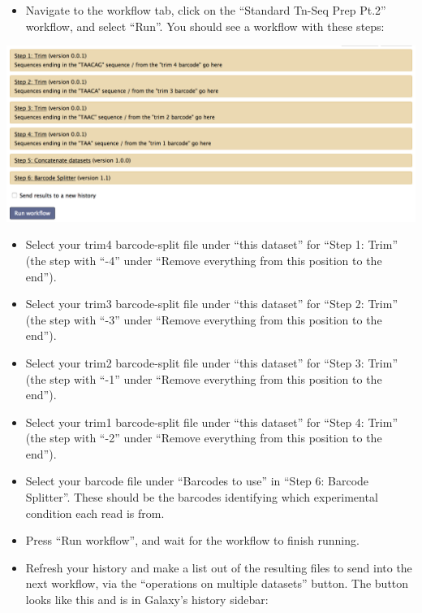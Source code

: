 \documentclass{article}
\begin{document}
\vspace{5 mm}

\begin{itemize}

\item Navigate to the workflow tab, click on the “Standard Tn-Seq Prep Pt.2” workflow, and select “Run”. You should see a workflow with these steps:

\end{itemize}

\vspace{5 mm}

\noindent
\includegraphics[scale=0.5]{StandPrep2.png}

\vspace{5 mm}

\begin{itemize}

\item Select your trim4 barcode-split file under “this dataset” for “Step 1: Trim” (the step with “-4” under “Remove everything from this position to the end”).
\item Select your trim3 barcode-split file under “this dataset” for “Step 2: Trim” (the step with “-3” under “Remove everything from this position to the end”).
\item Select your trim2 barcode-split file under “this dataset” for “Step 3: Trim” (the step with “-1” under “Remove everything from this position to the end”). 
\item Select your trim1 barcode-split file under “this dataset” for “Step 4: Trim” (the step with “-2” under “Remove everything from this position to the end”).
\item Select your barcode file under “Barcodes to use” in “Step 6: Barcode Splitter”. These should be the barcodes identifying which experimental condition each read is from.
\item Press “Run workflow”, and wait for the workflow to finish running.
\item Refresh your history and make a list out of the resulting files to send into the next workflow, via the “operations on multiple datasets” button. The button looks like this and is in Galaxy's history sidebar:

\end{itemize}
\end{document}
